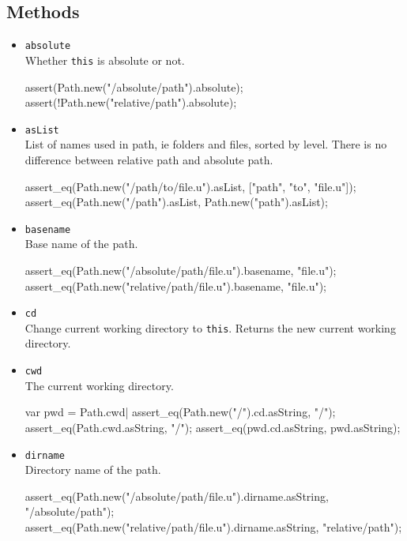 \subsection{Methods}
\begin{itemize}
\item \lstinline|absolute|\\
  Whether \lstinline|this| is absolute or not.
\begin{urbiscript}[firstnumber=last]
assert(Path.new("/absolute/path").absolute);
assert(!Path.new("relative/path").absolute);
\end{urbiscript}

\item \lstinline|asList|\\
  List of names used in path, ie folders and files, sorted by
  level. There is no difference between relative path and absolute
  path.
\begin{urbiscript}[firstnumber=last]
assert_eq(Path.new("/path/to/file.u").asList, ["path", "to", "file.u"]);
assert_eq(Path.new("/path").asList, Path.new("path").asList);
\end{urbiscript}

\item \lstinline|basename|\\
  Base name of the path.
\begin{urbiscript}[firstnumber=last]
assert_eq(Path.new("/absolute/path/file.u").basename, "file.u");
assert_eq(Path.new("relative/path/file.u").basename, "file.u");
\end{urbiscript}

\item \lstinline|cd|\\
  Change current working directory to \lstinline|this|. Returns the new
  current working directory.

\item \lstinline|cwd|\\
  The current working directory.
\begin{urbiscript}[firstnumber=last]
var pwd = Path.cwd|
assert_eq(Path.new("/").cd.asString, "/");
assert_eq(Path.cwd.asString, "/");
assert_eq(pwd.cd.asString, pwd.asString);
\end{urbiscript}

\item \lstinline|dirname|\\
  Directory name of the path.
\begin{urbiscript}[firstnumber=last]
assert_eq(Path.new("/absolute/path/file.u").dirname.asString,
          "/absolute/path");
assert_eq(Path.new("relative/path/file.u").dirname.asString,
          "relative/path");
\end{urbiscript}


\end{itemize}
